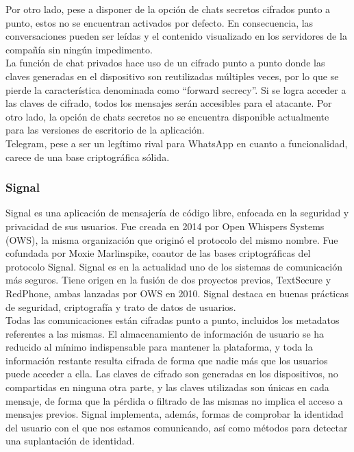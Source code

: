 Por otro lado, pese a disponer de la opción de chats secretos cifrados punto a punto, estos no se encuentran activados por defecto. En consecuencia, las conversaciones pueden ser leídas y el contenido visualizado en los servidores de la compañía sin ningún impedimento. \\

La función de chat privados hace uso de un cifrado punto a punto donde las claves generadas en el dispositivo son reutilizadas múltiples veces, por lo que se pierde la característica denominada como \hyphenquote{spanish}{forward secrecy}. Si se logra acceder a las claves de cifrado, todos los mensajes serán accesibles para el atacante. Por otro lado, la opción de chats secretos no se encuentra disponible actualmente para las versiones de escritorio de la aplicación. \\

Telegram, pese a ser un legítimo rival para WhatsApp en cuanto a funcionalidad, carece de una base criptográfica sólida.

\subsubsection {Signal}

Signal es una aplicación de mensajería de código libre, enfocada en la seguridad y privacidad de sus usuarios. Fue creada en 2014 por Open Whispers Systems (OWS), la misma organización que originó el protocolo del mismo nombre. Fue cofundada por Moxie Marlinspike, coautor de las bases criptográficas del protocolo Signal. Signal es en la actualidad uno de los sistemas de comunicación más seguros. Tiene origen en la fusión de dos proyectos previos, TextSecure y RedPhone, ambas lanzadas por OWS en 2010. Signal destaca en buenas prácticas de seguridad, criptografía y trato de datos de usuarios. \\

Todas las comunicaciones están cifradas punto a punto, incluidos los metadatos referentes a las mismas. El almacenamiento de información de usuario se ha reducido al mínimo indispensable para mantener la plataforma, y toda la información restante resulta cifrada de forma que nadie más que los usuarios puede acceder a ella. Las claves de cifrado son generadas en los dispositivos, no compartidas en ninguna otra parte, y las claves utilizadas son únicas en cada mensaje, de forma que la pérdida o filtrado de las mismas no implica el acceso a mensajes previos. Signal implementa, además, formas de comprobar la identidad del usuario con el que nos estamos comunicando, así como métodos para detectar una suplantación de identidad. \\

